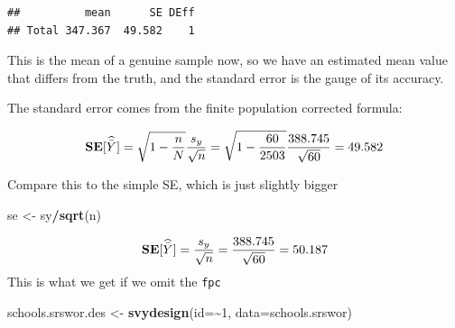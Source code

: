 \documentclass[
]{book}
\newenvironment{Shaded}{\begin{snugshade}}{\end{snugshade}}
\newcommand{\AttributeTok}[1]{\textcolor[rgb]{0.13,0.29,0.53}{#1}}
\newcommand{\CommentTok}[1]{\textcolor[rgb]{0.56,0.35,0.01}{\textit{#1}}}
\newcommand{\DecValTok}[1]{\textcolor[rgb]{0.00,0.00,0.81}{#1}}
\newcommand{\FunctionTok}[1]{\textcolor[rgb]{0.13,0.29,0.53}{\textbf{#1}}}
\newcommand{\NormalTok}[1]{#1}
\newcommand{\OtherTok}[1]{\textcolor[rgb]{0.56,0.35,0.01}{#1}}
\newcommand{\SpecialCharTok}[1]{\textcolor[rgb]{0.81,0.36,0.00}{\textbf{#1}}}
\newcommand{\bfa}[2]{{\rm\bf #1}[#2]}
\begin{document}
\begin{verbatim}
##          mean      SE DEff
## Total 347.367  49.582    1
\end{verbatim}

This is the mean of a genuine sample now, so we have an estimated mean value that
differs from the truth, and the standard error is the gauge of its accuracy.

The standard error comes from the finite population corrected formula:

\begin{Shaded}
\end{Shaded}

\[
   \bfa{SE}{\widehat{\bar{Y}}} 
   = \sqrt{1-\frac{n}{N}}\frac{s_y}{\sqrt{n}} 
   = \sqrt{1-\frac{60}{2503}}
     \frac{388.745}{\sqrt{60}} = 49.582
\]

Compare this to the simple SE, which is just slightly bigger

\begin{Shaded}
\begin{Highlighting}[]
\NormalTok{se }\OtherTok{\textless{}{-}}\NormalTok{ sy}\SpecialCharTok{/}\FunctionTok{sqrt}\NormalTok{(n)}
\end{Highlighting}
\end{Shaded}

\[
   \bfa{SE}{\widehat{\bar{Y}}} 
   = \frac{s_y}{\sqrt{n}} 
   = \frac{388.745}{\sqrt{60}} = 50.187
\]
This is what we get if we omit the \texttt{fpc}

\begin{Shaded}
\begin{Highlighting}[]
\NormalTok{schools.srswor.des }\OtherTok{\textless{}{-}} \FunctionTok{svydesign}\NormalTok{(}\AttributeTok{id=}\SpecialCharTok{\textasciitilde{}}\DecValTok{1}\NormalTok{, }\AttributeTok{data=}\NormalTok{schools.srswor)}
\end{Highlighting}
\end{Shaded}
\end{document}
